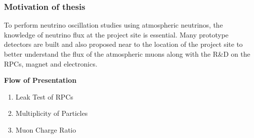 \documentclass{beamer}
\begin{document}
\begin{frame}
\begin{columns}
\begin{column}{0.5\textwidth}
\begin{figure}
\begin{center}
        \end{center}
      \end{figure} 
    \end{column}
  \end{columns}
\end{frame}

\begin{frame}
  \frametitle{Motivation of thesis}
  \begin{tcolorbox}
    To perform neutrino oscillation studies using atmospheric
    neutrinos, the knowledge of neutrino flux at the project site
    is essential.
    Many prototype detectors are built and also proposed
    near to the location of the project site to better
    understand the flux of the atmospheric muons along with
    the R\&D on the RPCs, magnet and electronics.
  \end{tcolorbox}
  \vspace{1cm}
  \colorbox{gray!40}{\begin{minipage}{0.4\textwidth}%
      \bf {Flow of Presentation} 
  \end{minipage}}
  \begin{minipage}{1.0\textwidth}
    \vspace{5pt}
    \begin{enumerate}
    \item Leak Test of RPCs
    \item Multiplicity of Particles
    \item Muon Charge Ratio
    \end{enumerate} 
  \end{minipage}
\end{frame}
\end{document}
